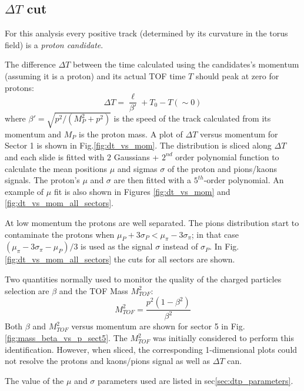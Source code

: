 \subsection{$\Delta T$ cut}
\label{sec:clas_timing}

For this analysis every positive track (determined by its curvature in the torus field) 
is a {\it proton candidate}.

The difference $\Delta T$ between the time calculated using
the candidates's momentum (assuming it is a proton) and its actual TOF time $T$ 
should peak at zero for protons:
\begin{equation}
 \label{eq:protondt}
  \Delta T = \frac{\ell}{\beta'} + T_{0} - T (\sim0 )
\end{equation}
where $\beta' = \sqrt{ p^2 /( M_P^2 + p^2 ) }$ is the speed of the track calculated from its
momentum and $M_P$ is the proton mass. 
A plot of $\Delta T$ versus momentum for Sector 1 is shown in 
Fig.\ref{fig:dt_vs_mom}. The distribution is sliced along $\Delta T$ and each slide is fitted
with $2$ Gaussians + $2^{nd}$ order polynomial function to calculate the mean 
positions $\mu$ and sigmas $\sigma$ of the proton and pions/kaons signals. 
The proton's $\mu$ and $\sigma$ are then fitted with a $5^{th}$-order polynomial. 
An example of $\mu$ fit is also shown in 
Figures \ref{fig:dt_vs_mom} and \ref{fig:dt_vs_mom_all_sectors}.

At low momentum the protons are well separated.  The pions distribution 
start to contaminate the protons when
$\mu_{P} + 3\sigma_{P} < \mu_{\pi} - 3\sigma_{\pi}$;  in that case 
$(\mu_{\pi} - 3\sigma_{\pi} - \mu_{P})/3$ is used as the signal $\sigma$ instead of $\sigma_{P}$.
In Fig.\ref{fig:dt_vs_mom_all_sectors} the cuts for all sectors are shown. 

Two quantities normally used to monitor the quality of the charged particles
selection are $\beta$ and the TOF Mass $M_{TOF}^2$:
$$
 M_{TOF}^2 = \frac{p^2(1-\beta^2)}{\beta^2}
$$
Both $\beta$ and $M_{TOF}^2$ versus momentum are shown for sector 5 in 
Fig.\ref{fig:mass_beta_vs_p_sect5}. The $M_{TOF}^2$ was initially considered
to perform this identification. However, when sliced, the corresponding
1-dimensional plots could not resolve the protons and kaons/pions signal 
as well as $\Delta T$ can.

The value of the $\mu$ and $\sigma$ parameters used are listed in sec\ref{sec:dtp_parameters}.




